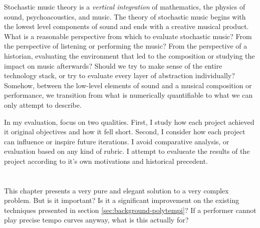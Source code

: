 Stochastic music theory is a \textit{vertical integration} of
mathematics, the physics of sound, psychoacoustics, and music. The
theory of stochastic music begins with the lowest level components of
sound and ends with a creative musical product. What is a reasonable
perspective from which to evaluate stochastic music? From the
perspective of listening or performing the music? From the
perspective of a historian, evaluating the environment that led to the
composition or studying the impact on music afterwards?  Should we
try to make sense of the entire technology stack, or try to evaluate
every layer of abstraction individually? Somehow, between the
low-level elements of sound and a musical composition or performance,
we transition from what is numerically quantifiable to what we can
only attempt to describe.

In my evaluation, focus on two qualities. First, I study how each
project achieved it original objectives and how it fell short. Second,
I consider how each project can influence or inspire future
iterations. I avoid comparative analysis, or evaluation based on any
kind of rubric. I attempt to evalueate the results of the project
according to it's own motivations and historical precedent.


\section{\polytempic}
This chapter presents a very pure and elegant solution to a very
complex problem. But is it important? Is it a significant improvement
on the existing techniques presented in section
\ref{sec:background-polytempi}? If a performer cannot play precise
tempo curves anyway, what is this actually for?


